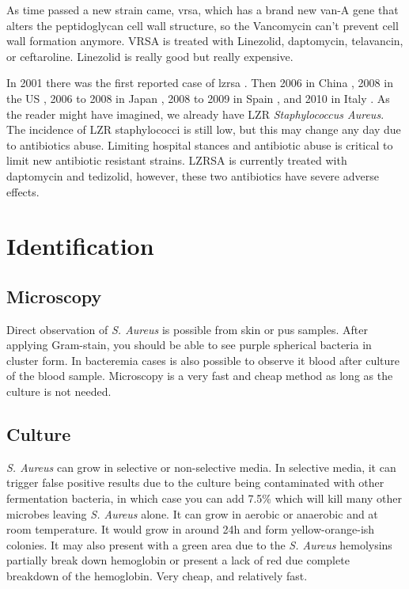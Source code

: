 As time passed a new strain came, \gls{vrsa}, which has a brand new van-A gene that alters the peptidoglycan cell wall structure, so the Vancomycin can't prevent cell wall formation anymore. VRSA is treated with Linezolid, daptomycin, telavancin, or ceftaroline. Linezolid is really good but really expensive.

In 2001 there was the first reported case of \gls{lzrsa} \cite{Tsiodras2001}. Then 2006 in China \cite{Jones2007}, 2008 in the US \cite{Mendes2008}, 2006 to 2008 in Japan \cite{IkedaDantsuji2011}, 2008 to 2009 in Spain \cite{Seral2011}, and 2010 in Italy \cite{Mendes2010}. As the reader might have imagined, we already have LZR \textit{Staphylococcus Aureus}. The incidence of LZR staphylococci is still low, but this may change any day due to antibiotics abuse. Limiting hospital stances and antibiotic abuse is critical to limit new antibiotic resistant strains. LZRSA is currently treated with daptomycin and tedizolid, however, these two antibiotics have severe adverse effects.

\section{Identification}

\subsection{Microscopy}

Direct observation of \textit{S. Aureus} is possible from skin or pus samples. After applying Gram-stain, you should be able to see purple spherical bacteria in cluster form. In bacteremia cases is also possible to observe it blood after culture of the blood sample. Microscopy is a very fast and cheap method as long as the culture is not needed.

\subsection{Culture}
\label{staph:culture}

\textit{S. Aureus} can grow in selective or non-selective media. In selective media, it can trigger false positive results due to the culture being contaminated with other fermentation bacteria, in which case you can add 7.5\%  which will kill many other microbes leaving \textit{S. Aureus} alone. It can grow in aerobic or anaerobic and at room temperature. It would grow in around 24h and form yellow-orange-ish colonies. It may also present with a green area due to the \textit{S. Aureus} hemolysins partially break down hemoglobin or present a lack of red due complete breakdown of the hemoglobin. Very cheap, and relatively fast.

